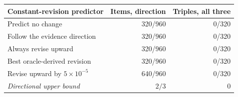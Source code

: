 \begin{tabular}{lrr}
\toprule
Constant-revision predictor & Items, direction & Triples, all three \\
\midrule
Predict no change & 320/960 & 0/320 \\
Follow the evidence direction & 320/960 & 0/320 \\
Always revise upward & 320/960 & 0/320 \\
Best oracle-derived revision & 320/960 & 0/320 \\
Revise upward by $5\times10^{-5}$ & 640/960 & 0/320 \\
\emph{Directional upper bound} & $2/3$ & $0$ \\
\bottomrule
\end{tabular}

